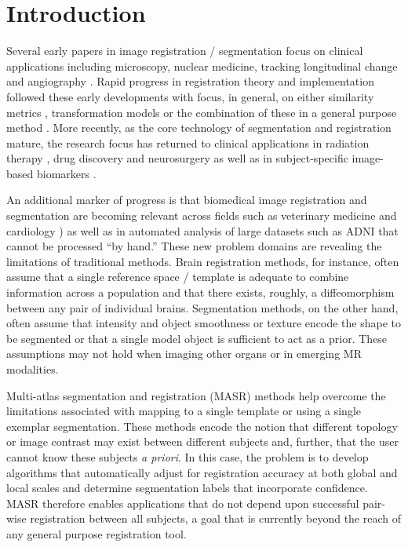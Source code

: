 \documentclass{llncs}
\begin{document}
\section{Introduction}
Several early papers in image registration / segmentation focus on 
clinical applications including microscopy, nuclear medicine, tracking longitudinal
change and angiography
\cite{Badran1991,Venot1986,Venot1984,Wrigley1982,Adair1981}.  Rapid progress in registration
theory and implementation followed these early developments with
focus, in general, on either similarity metrics \cite{Wells1996},
transformation models \cite{Miller2005} or the combination of these in a general
purpose method \cite{Rueckert1999}.  More recently, as the core technology of segmentation and
registration mature, the research focus has returned to clinical
applications in radiation therapy \cite{Chan2013}, drug discovery \cite{Fox2009} and
neurosurgery \cite{Omara2013} as well as in subject-specific image-based
biomarkers \cite{Loggia2013}.  

An additional marker of progress is that biomedical
image registration and segmentation are becoming relevant across
fields such as veterinary medicine \cite{Harmon2013} and cardiology
\cite{Veress2013}) as well as in automated analysis of large datasets
such as ADNI \cite{Weiner2012} that cannot be processed ``by hand.''
These new problem domains are revealing the limitations of traditional
methods.  Brain registration methods, for instance, often assume that
a single reference space / template is adequate to combine information
across a population and that there exists, roughly, a diffeomorphism
between any pair of individual brains.  Segmentation methods, on the
other hand, often assume that intensity and object smoothness or
texture encode the shape to be segmented or that a single model object
is sufficient to act as a prior.  These assumptions may not
hold when imaging other organs or in emerging MR modalities.  

Multi-atlas segmentation and registration (MASR) methods help overcome
the limitations associated with mapping to a single template or using
a single exemplar segmentation.  These methods encode the notion that
different topology or image contrast may exist between different
subjects and, further, that the user cannot know these subjects {\em a
priori}.  In this case, the problem is to develop algorithms that
automatically adjust for registration accuracy at both global and
local scales and determine segmentation labels that incorporate
confidence.  MASR therefore enables applications that do not depend upon
successful pair-wise registration between all subjects, a goal that is
currently beyond the reach of any general purpose registration tool.
\end{document}
